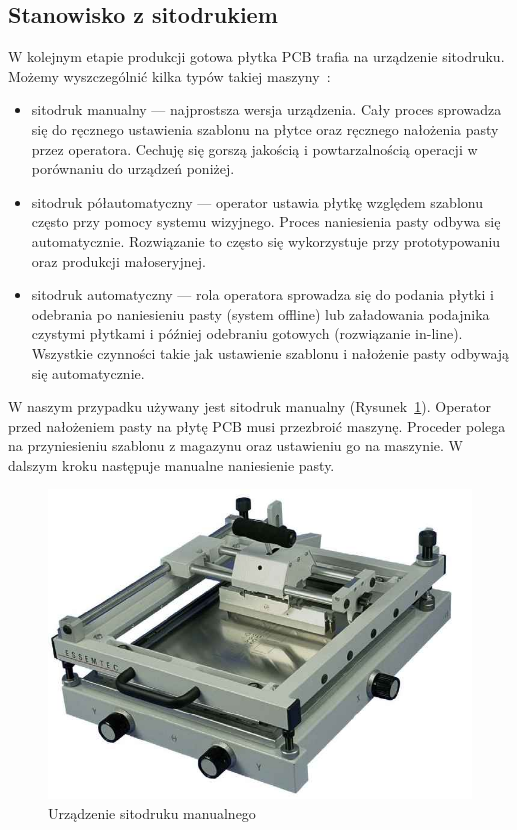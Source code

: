 \subsection{Stanowisko z sitodrukiem}
W kolejnym etapie produkcji gotowa płytka PCB trafia na urządzenie sitodruku.
Możemy wyszczególnić kilka typów takiej maszyny~\cite{sitodruk}:
\begin{itemize}
	\item sitodruk manualny --- najprostsza wersja urządzenia. Cały proces sprowadza się do ręcznego ustawienia szablonu na płytce oraz ręcznego nałożenia pasty przez operatora. Cechuję się gorszą jakością i powtarzalnością operacji w porównaniu do urządzeń poniżej.
	\item sitodruk półautomatyczny --- operator ustawia płytkę względem szablonu często przy pomocy systemu wizyjnego. Proces naniesienia pasty odbywa się automatycznie. Rozwiązanie to często się wykorzystuje przy prototypowaniu oraz produkcji małoseryjnej.
	\item sitodruk automatyczny --- rola operatora sprowadza się do podania płytki i odebrania po naniesieniu pasty (system offline) lub załadowania podajnika czystymi płytkami i później odebraniu gotowych (rozwiązanie in-line). Wszystkie czynności takie jak ustawienie szablonu i nałożenie pasty odbywają się automatycznie.
\end{itemize}

W naszym przypadku używany jest sitodruk manualny (Rysunek~\ref{sitodruk}). Operator przed nałożeniem pasty na płytę PCB musi przezbroić maszynę. Proceder polega na przyniesieniu szablonu z magazynu oraz ustawieniu go na maszynie. W dalszym kroku następuje manualne naniesienie pasty.

\begin{figure}[H]
	\centering
	\includegraphics[scale=0.3]{./chapters/chapter2/sitodruk.jpg}
	\caption{Urządzenie sitodruku manualnego~\cite{sitodruk}}
	\label{sitodruk}
\end{figure}

